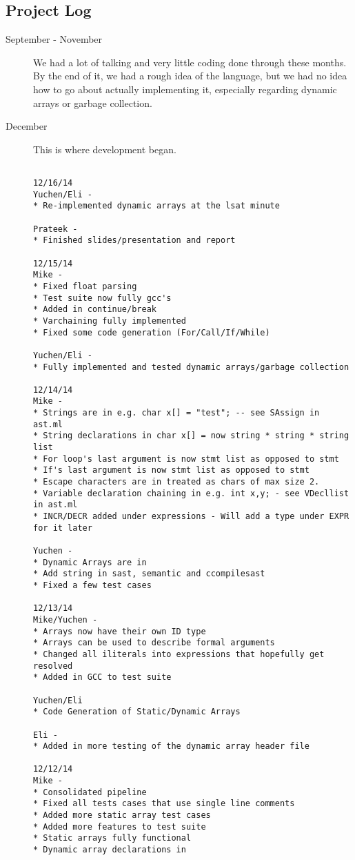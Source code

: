 \documentclass[a4paper]{article}
\begin{document}
\subsection{Project Log}
\begin{description}
\item[September - November] We had a lot of talking and very little coding done through these months. By the end of it, we had a rough idea of the language, but we had no idea how to go about actually implementing it, especially regarding dynamic arrays or garbage collection.
\item[December] This is where development began.

\footnotesize
\begin{verbatim}

12/16/14
Yuchen/Eli -
* Re-implemented dynamic arrays at the lsat minute

Prateek -
* Finished slides/presentation and report

12/15/14
Mike -
* Fixed float parsing
* Test suite now fully gcc's
* Added in continue/break
* Varchaining fully implemented
* Fixed some code generation (For/Call/If/While)

Yuchen/Eli -
* Fully implemented and tested dynamic arrays/garbage collection

12/14/14
Mike - 
* Strings are in e.g. char x[] = "test"; -- see SAssign in ast.ml
* String declarations in char x[] = now string * string * string list
* For loop's last argument is now stmt list as opposed to stmt
* If's last argument is now stmt list as opposed to stmt
* Escape characters are in treated as chars of max size 2.
* Variable declaration chaining in e.g. int x,y; - see VDecllist in ast.ml
* INCR/DECR added under expressions - Will add a type under EXPR for it later

Yuchen -
* Dynamic Arrays are in
* Add string in sast, semantic and ccompilesast
* Fixed a few test cases

12/13/14
Mike/Yuchen -
* Arrays now have their own ID type
* Arrays can be used to describe formal arguments
* Changed all iliterals into expressions that hopefully get resolved
* Added in GCC to test suite

Yuchen/Eli
* Code Generation of Static/Dynamic Arrays

Eli -
* Added in more testing of the dynamic array header file

12/12/14
Mike -
* Consolidated pipeline
* Fixed all tests cases that use single line comments
* Added more static array test cases
* Added more features to test suite
* Static arrays fully functional
* Dynamic array declarations in


\end{verbatim}
\end{description}
\end{document}
